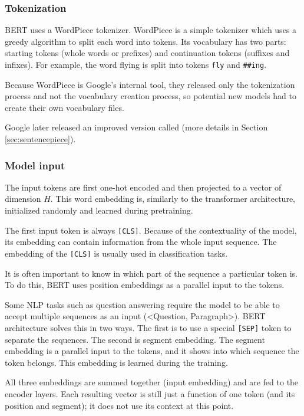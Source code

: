 \documentclass[
  printed, %
  color,   %
  table,   %
  oneside, %
  lof,     %
  lot,     %
]{fithesis3}
\begin{document}
\subsubsection{Tokenization}
BERT uses a WordPiece tokenizer\parencite[Section 4.1]{google-translation}. WordPiece is a simple tokenizer which uses a greedy algorithm to split each word into tokens. Its vocabulary has two parts: starting tokens (whole words or prefixes) and continuation tokens (suffixes and infixes). For example, the word flying is split into tokens \texttt{fly} and \texttt{\#\#ing}.

Because WordPiece is Google's internal tool, they released only the tokenization process and not the vocabulary creation process, so potential new models had to create their own vocabulary files.

Google later released an improved version called  (more details in Section \ref{sec:sentencepiece}). 


\subsubsection{Model input}
The input tokens are first one-hot encoded and then projected to a vector of dimension $H$. This word embedding is, similarly to the transformer architecture, initialized randomly and learned during pretraining.

The first input token is always \texttt{[CLS]}. Because of the contextuality of the model, its embedding can contain information from the whole input sequence. The embedding of the \texttt{[CLS]} is usually used in classification tasks.

It is often important to know in which part of the sequence a particular token is. To do this, BERT uses position embeddings as a parallel input to the tokens.

Some NLP tasks such as question answering require the model to be able to accept multiple sequences as an input (<Question, Paragraph>). BERT architecture solves this in two ways. The first is to use a special \texttt{[SEP]} token to separate the sequences. The second is segment embedding. The segment embedding is a parallel input to the tokens, and it shows into which sequence the token belongs. This embedding is learned during the training. 

All three embeddings are summed together (input embedding) and are fed to the encoder layers. Each resulting vector is still just a function of one token (and its position and segment); it does not use its context at this point.
\end{document}
